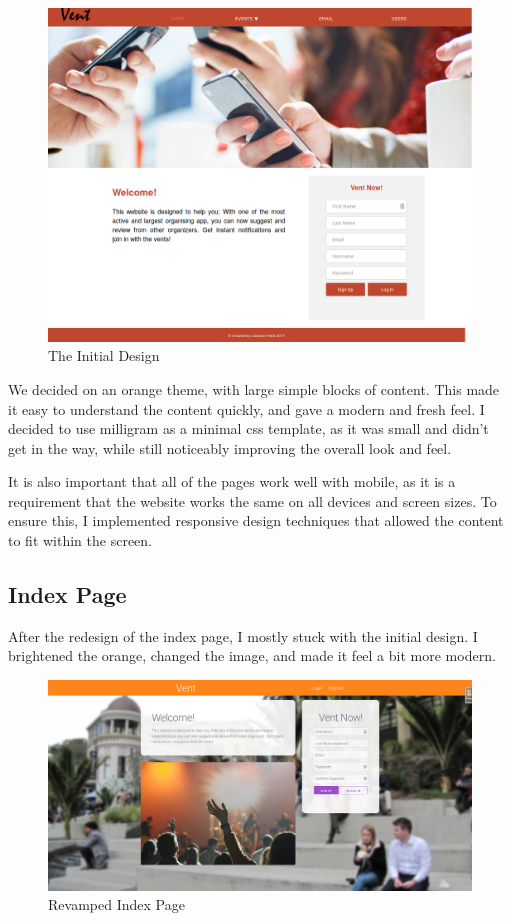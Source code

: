 \documentclass[a4paper,oneside,12pt]{report}
\begin{document}
	\begin{figure}[H]
		\caption{The Initial Design}
		\includegraphics[width=\linewidth]{static/front-end1.png}
	\end{figure}

	We decided on an orange theme, with large simple blocks of content. This made it easy to understand the content quickly, and gave a modern and fresh feel. I decided to use milligram as a minimal css template, as it was small and didn't get in the way, while still noticeably improving the overall look and feel.

	It is also important that all of the pages work well with mobile, as it is a requirement that the website works the same on all devices and screen sizes. To ensure this, I implemented responsive design techniques that allowed the content to fit within the screen.

	\subsection{Index Page}
	After the redesign of the index page, I mostly stuck with the initial design. I brightened the orange, changed the image, and made it feel a bit more modern.

	\begin{figure}[H]
		\caption{Revamped Index Page}
		\includegraphics[width=\linewidth]{static/front-end2.jpg}
	\end{figure}
\end{document}
